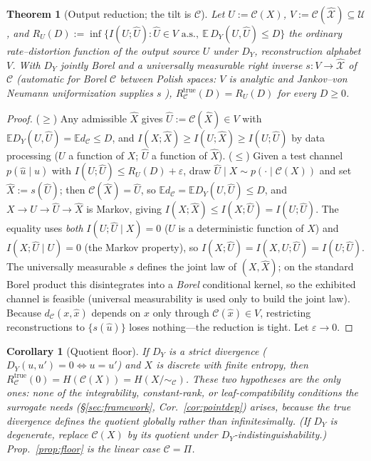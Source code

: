 \documentclass[lettersize,onecolumn]{IEEEtran}
\newtheorem{theorem}{Theorem}
\newtheorem{corollary}{Corollary}
\theoremstyle{definition}
\theoremstyle{remark}
\newcommand{\E}{\mathbb{E}}
\begin{document}
\begin{theorem}[Output reduction; the tilt is $\mathcal{C}$]\label{thm:B2}
Let $U:=\mathcal{C}(X)$, $V:=\mathcal{C}(\hat{\mathcal{X}})\subseteq\mathcal{U}$, and
$R_U(D):=\inf\{I(U;\hat U):\hat U\in V\text{ a.s.},\ \E\,D_Y(U,\hat U)\le D\}$ the
ordinary rate--distortion function of the output source $U$ under $D_Y$, reconstruction
alphabet $V$. With $D_Y$ jointly Borel and a universally measurable right inverse
$s:V\to\hat{\mathcal{X}}$ of $\mathcal{C}$ (automatic for Borel $\mathcal{C}$ between
Polish spaces: $V$ is analytic and Jankov--von Neumann uniformization supplies $s$
\cite{kechris1995}), $R_{\mathcal{C}}^{\mathrm{true}}(D)=R_U(D)$ for every $D\ge0$.
\end{theorem}
\begin{proof}
($\ge$) Any admissible $\hat X$ gives $\hat U:=\mathcal{C}(\hat X)\in V$ with
$\E D_Y(U,\hat U)=\E d_{\mathcal{C}}\le D$, and $I(X;\hat X)\ge I(U;\hat X)\ge
I(U;\hat U)$ by data processing ($U$ a function of $X$; $\hat U$ a function of
$\hat X$). ($\le$) Given a test channel $p(\hat u\mid u)$ with $I(U;\hat U)\le
R_U(D)+\varepsilon$, draw $\hat U\mid X\sim p(\cdot\mid\mathcal{C}(X))$ and set
$\hat X:=s(\hat U)$; then $\mathcal{C}(\hat X)=\hat U$, so $\E d_{\mathcal{C}}=\E
D_Y(U,\hat U)\le D$, and $X\to U\to\hat U\to\hat X$ is Markov, giving $I(X;\hat X)\le
I(X;\hat U)=I(U;\hat U)$. The equality uses \emph{both} $I(U;\hat U\mid X)=0$ ($U$ is
a deterministic function of $X$) and $I(X;\hat U\mid U)=0$ (the Markov property), so
$I(X;\hat U)=I(X,U;\hat U)=I(U;\hat U)$. The universally measurable $s$ defines the
joint law of $(X,\hat X)$; on the standard Borel product this disintegrates into a
\emph{Borel} conditional kernel, so the exhibited channel is feasible (universal
measurability is used only to build the joint law). Because $d_{\mathcal{C}}(x,\hat x)$
depends on $\hat x$ only through $\mathcal{C}(\hat x)\in V$, restricting reconstructions
to $\{s(\hat u)\}$ loses nothing---the reduction is tight. Let $\varepsilon\to0$.
\end{proof}

\begin{corollary}[Quotient floor]\label{cor:B2a}
If $D_Y$ is a \emph{strict} divergence ($D_Y(u,u')=0\iff u=u'$) and $X$ is discrete
with finite entropy, then $R_{\mathcal{C}}^{\mathrm{true}}(0)=H(\mathcal{C}(X))=
H(X/\!\sim_{\mathcal{C}})$. These two hypotheses are the only ones: \emph{none} of the
integrability, constant-rank, or leaf-compatibility conditions the \emph{surrogate}
needs (\S\ref{sec:framework}, Cor.~\ref{cor:pointdep}) arises, because the true
divergence defines the quotient globally rather than infinitesimally. (If $D_Y$ is
degenerate, replace $\mathcal{C}(X)$ by its quotient under $D_Y$-indistinguishability.)
Prop.~\ref{prop:floor} is the linear case $\mathcal{C}=\Pi$.
\end{corollary}
\end{document}
